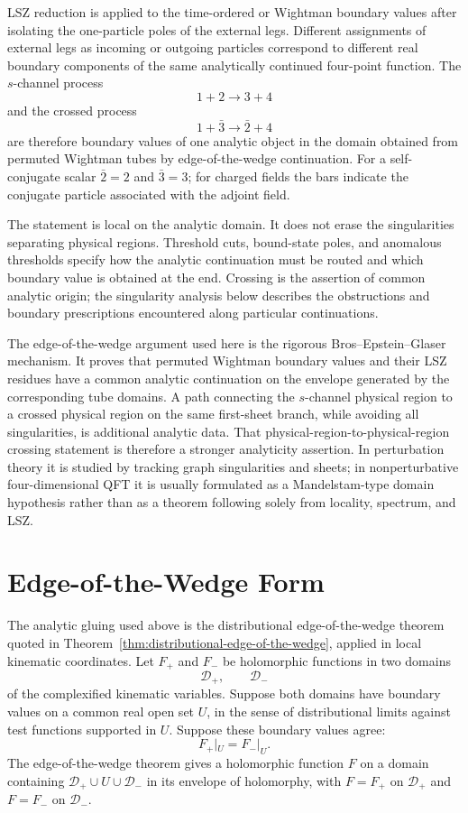 LSZ reduction is applied to the time-ordered or Wightman boundary values after
isolating the one-particle poles of the external legs.  Different assignments
of external legs as incoming or outgoing particles correspond to different
real boundary components of the same analytically continued four-point
function.  The \(s\)-channel process
\[
  1+2\to3+4
\]
and the crossed process
\[
  1+\bar{3}\to\bar{2}+4
\]
are therefore boundary values of one analytic object in the domain obtained
from permuted Wightman tubes by edge-of-the-wedge continuation.  For a
self-conjugate scalar \(\bar{2}=2\) and \(\bar{3}=3\); for charged fields the
bars indicate the conjugate particle associated with the adjoint field.

The statement is local on the analytic domain.  It does not erase the
singularities separating physical regions.  Threshold cuts, bound-state poles,
and anomalous thresholds specify how the analytic continuation must be routed
and which boundary value is obtained at the end.  Crossing is the assertion of
common analytic origin; the singularity analysis below describes the
obstructions and boundary prescriptions encountered along particular
continuations.

\begin{warning}
The edge-of-the-wedge argument used here is the rigorous
Bros--Epstein--Glaser mechanism.  It proves that permuted Wightman boundary
values and their LSZ residues have a common analytic continuation on the
envelope generated by the corresponding tube domains.  A path connecting the
\(s\)-channel physical region to a crossed physical region on the same
first-sheet branch, while avoiding all singularities, is additional analytic
data.  That physical-region-to-physical-region crossing statement is therefore
a stronger analyticity assertion.  In perturbation theory it is studied by
tracking graph singularities and sheets; in nonperturbative four-dimensional
QFT it is usually formulated as a Mandelstam-type domain hypothesis rather
than as a theorem following solely from locality, spectrum, and LSZ.
\end{warning}

\section{Edge-of-the-Wedge Form}

The analytic gluing used above is the distributional edge-of-the-wedge theorem
quoted in Theorem~\ref{thm:distributional-edge-of-the-wedge}, applied in local
kinematic coordinates.  Let \(F_+\) and \(F_-\) be holomorphic functions in two
domains
\[
  \mathcal D_+,\qquad \mathcal D_-
\]
of the complexified kinematic variables.  Suppose both domains have boundary
values on a common real open set \(U\), in the sense of distributional limits
against test functions supported in \(U\).  Suppose these boundary values
agree:
\[
  F_+|_U=F_-|_U .
\]
The edge-of-the-wedge theorem gives a holomorphic function \(F\) on a domain
containing \(\mathcal D_+\cup U\cup\mathcal D_-\) in its envelope of
holomorphy, with \(F=F_+\) on \(\mathcal D_+\) and \(F=F_-\) on
\(\mathcal D_-\).

